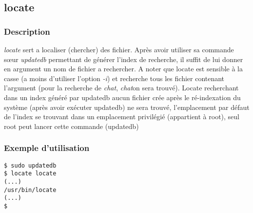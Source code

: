 \subsection*{locate}
\subsubsection*{Description}
\emph{locate} sert a localiser (chercher) des fichier. Après avoir utiliser sa commande sœur \emph{updatedb} permettant de générer l'index de recherche, il suffit de lui donner en argument un nom de fichier a rechercher.
A noter que locate est sensible à la casse (a moins d'utiliser l'option \emph{-i}) et recherche tous les fichier contenant l'argument (pour la recherche de \emph{chat}, \emph{chat}on sera trouvé).
Locate recherchant dans un index généré par updatedb aucun fichier crée après le ré-indexation du système (après avoir exécuter updatedb) ne sera trouvé, l'emplacement par défaut de l'index se trouvant dans un emplacement privilégié (appartient à root), seul root peut lancer cette commande (updatedb)

\subsubsection*{Exemple d'utilisation}

\begin{lstlisting}
$ sudo updatedb
$ locate locate
(...)
/usr/bin/locate
(...)
$
\end{lstlisting}
